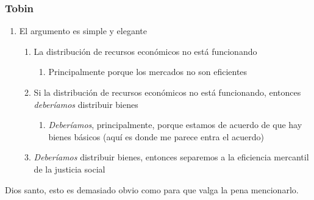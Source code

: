 \documentclass{beamer}
\begin{document}
\begin{frame}
\frametitle{Tobin}
    \begin{enumerate}
    \item El argumento es simple y elegante
        \begin{enumerate}
        \item La distribución de recursos económicos no está funcionando
            \begin{enumerate}
            \item Principalmente porque los mercados no son eficientes
            \end{enumerate}
    \item Si la distribución de recursos económicos no está funcionando, entonces \emph{deberíamos} distribuir bienes
        \begin{enumerate}
        \item \emph{Deberíamos}, principalmente, porque estamos de acuerdo de que hay bienes básicos (aquí es donde me parece entra el acuerdo)
        \end{enumerate}
  \item \emph{Deberíamos} distribuir bienes, entonces separemos a la eficiencia mercantil de la justicia social
  \end{enumerate}
  \end{enumerate}
\end{frame}


\begin{frame}[standout]
Dios santo, esto es demasiado obvio como para que valga la pena mencionarlo.
\end{frame}


\end{document}
